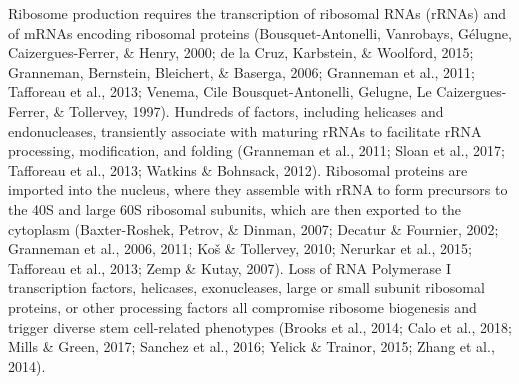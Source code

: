 \documentclass[12pt,twoside]{reedthesis}
\begin{document}
Ribosome production requires the transcription of ribosomal RNAs (rRNAs)
and of mRNAs encoding ribosomal proteins (Bousquet-Antonelli, Vanrobays, Gélugne, Caizergues-Ferrer, \& Henry, 2000; de la Cruz, Karbstein, \& Woolford, 2015; Granneman, Bernstein, Bleichert, \& Baserga, 2006; Granneman et al., 2011; Tafforeau et al., 2013; Venema, Cile Bousquet-Antonelli, Gelugne, Le Caizergues-Ferrer, \& Tollervey, 1997). Hundreds of factors,
including helicases and endonucleases, transiently associate with
maturing rRNAs to facilitate rRNA processing, modification, and folding
(Granneman et al., 2011; Sloan et al., 2017; Tafforeau et al., 2013; Watkins \& Bohnsack, 2012).
Ribosomal proteins are imported into the nucleus, where they assemble
with rRNA to form precursors to the 40S and large 60S ribosomal
subunits, which are then exported to the cytoplasm
(Baxter-Roshek, Petrov, \& Dinman, 2007; Decatur \& Fournier, 2002; Granneman et al., 2006, 2011; Koš \& Tollervey, 2010; Nerurkar et al., 2015; Tafforeau et al., 2013; Zemp \& Kutay, 2007). Loss of RNA Polymerase I transcription
factors, helicases, exonucleases, large or small subunit ribosomal
proteins, or other processing factors all compromise ribosome biogenesis
and trigger diverse stem cell-related phenotypes (Brooks et al., 2014; Calo et al., 2018; Mills \& Green, 2017; Sanchez et al., 2016; Yelick \& Trainor, 2015; Zhang et al., 2014).
\end{document}

